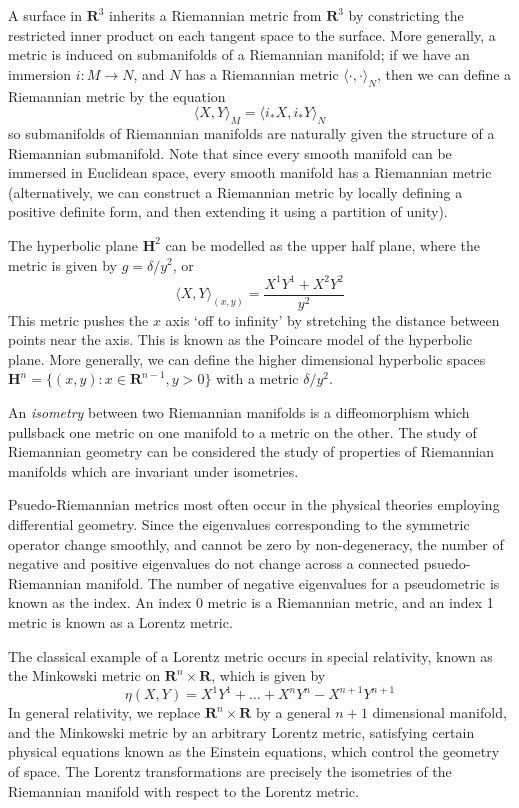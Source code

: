 \begin{example}
    A surface in $\mathbf{R}^3$ inherits a Riemannian metric from $\mathbf{R}^3$ by constricting the restricted inner product on each tangent space to the surface. More generally, a metric is induced on submanifolds of a Riemannian manifold; if we have an immersion $i: M \to N$, and $N$ has a Riemannian metric $\langle \cdot, \cdot \rangle_N$, then we can define a Riemannian metric by the equation
    \[ \langle X, Y \rangle_M = \langle i_*X, i_*Y \rangle_N \]
    so submanifolds of Riemannian manifolds are naturally given the structure of a Riemannian submanifold. Note that since every smooth manifold can be immersed in Euclidean space, every smooth manifold has a Riemannian metric (alternatively, we can construct a Riemannian metric by locally defining a positive definite form, and then extending it using a partition of unity).
\end{example}

\begin{example}
    The hyperbolic plane $\mathbf{H}^2$ can be modelled as the upper half plane, where the metric is given by $g = \delta/y^2$, or
    \[ \langle X, Y \rangle_{(x,y)} = \frac{X^1Y^1 + X^2Y^2}{y^2} \]
    This metric pushes the $x$ axis `off to infinity' by stretching the distance between points near the axis. This is known as the Poincare model of the hyperbolic plane. More generally, we can define the higher dimensional hyperbolic spaces $\mathbf{H}^n = \{ (x,y): x \in \mathbf{R}^{n-1}, y > 0 \}$ with a metric $\delta/y^2$.
\end{example}

An \emph{isometry} between two Riemannian manifolds is a diffeomorphism which pullsback one metric on one manifold to a metric on the other. The study of Riemannian geometry can be considered the study of properties of Riemannian manifolds which are invariant under isometries.

Psuedo-Riemannian metrics most often occur in the physical theories employing differential geometry. Since the eigenvalues corresponding to the symmetric operator change smoothly, and cannot be zero by non-degeneracy, the number of negative and positive eigenvalues do not change across a connected psuedo-Riemannian manifold. The number of negative eigenvalues for a pseudometric is known as the index. An index 0 metric is a Riemannian metric, and an index 1 metric is known as a Lorentz metric.

\begin{example}
    The classical example of a Lorentz metric occurs in special relativity, known as the Minkowski metric on $\mathbf{R}^n \times \mathbf{R}$, which is given by
    \[ \eta(X,Y) = X^1Y^1 + \dots + X^nY^n - X^{n+1}Y^{n+1} \]
    In general relativity, we replace $\mathbf{R}^n \times \mathbf{R}$ by a general $n+1$ dimensional manifold, and the Minkowski metric by an arbitrary Lorentz metric, satisfying certain physical equations known as the Einstein equations, which control the geometry of space. The Lorentz transformations are precisely the isometries of the Riemannian manifold with respect to the Lorentz metric.
\end{example}

